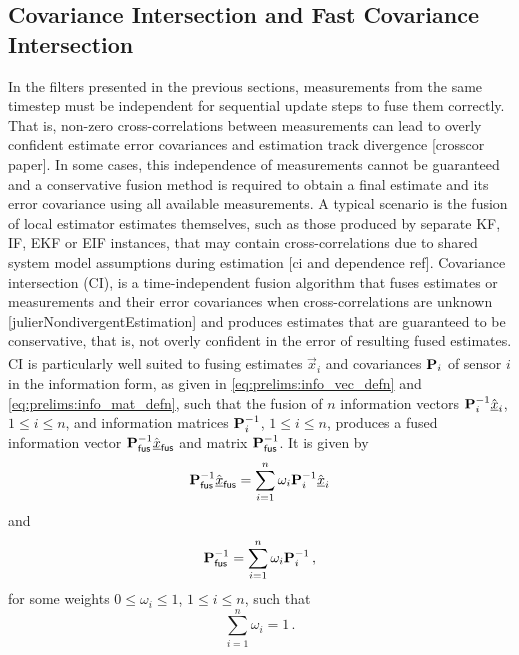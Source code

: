 \subsection{Covariance Intersection and Fast Covariance Intersection}\label{subsec:prelims:fci}
In the filters presented in the previous sections, measurements from the same timestep must be independent for sequential update steps to fuse them correctly. That is, non-zero cross-correlations between measurements can lead to overly confident estimate error covariances and estimation track divergence [crosscor paper]. In some cases, this independence of measurements cannot be guaranteed and a conservative fusion method is required to obtain a final estimate and its error covariance using all available measurements. A typical scenario is the fusion of local estimator estimates themselves, such as those produced by separate KF, IF, EKF or EIF instances, that may contain cross-correlations due to shared system model assumptions during estimation [ci and dependence ref]. Covariance intersection (CI), is a time-independent fusion algorithm that fuses estimates or measurements and their error covariances when cross-correlations are unknown [julierNondivergentEstimation] and produces estimates that are guaranteed to be conservative, that is, not overly confident in the error of resulting fused estimates. CI is particularly well suited to fusing estimates $\hat{\vec{x}}_i$ and covariances ${{\mathbf{P}}}_i$ of sensor $i$ in the information form, as given in \eqref{eq:prelims:info_vec_defn} and \eqref{eq:prelims:info_mat_defn}, such that the fusion of $n$ information vectors ${{\mathbf{P}}}_i^{-1}\hat{{\underline{x}}}_i$, $1\leq i\leq n$, and information matrices ${{\mathbf{P}}}_i^{-1}$, $1\leq i\leq n$, produces a fused information vector ${{\mathbf{P}}}_{\mathsf{fus}}^{-1}\hat{{\underline{x}}}_{\mathsf{fus}}$ and matrix ${{\mathbf{P}}}_{\mathsf{fus}}^{-1}$. It is given by
\begin{equation}\label{eq:prelims:ci_info_vec}
    {\ensuremath{{\mathbf{P}}}}_{\mathsf{fus}}^{-1}\hat{{\underline{x}}}_{\mathsf{fus}} = \sum_{i=1}^n \omega_i {{\mathbf{P}}}_i^{-1} \hat{{\underline{x}}}_i
\end{equation}
and
\begin{equation}\label{eq:prelims:ci_info_mat}
{\ensuremath{{\mathbf{P}}}}_{\mathsf{fus}}^{-1}=\sum_{i=1}^{n}\omega_i {{\mathbf{P}}}_i^{-1}\,,
\end{equation}
for some weights $0\leq \omega_i \leq 1$, $1\leq i \leq n$, such that
\begin{equation}\label{eq:prelims:ci_weight_sum}
    \sum_{i=1}^n \omega_i = 1\,.
\end{equation}
